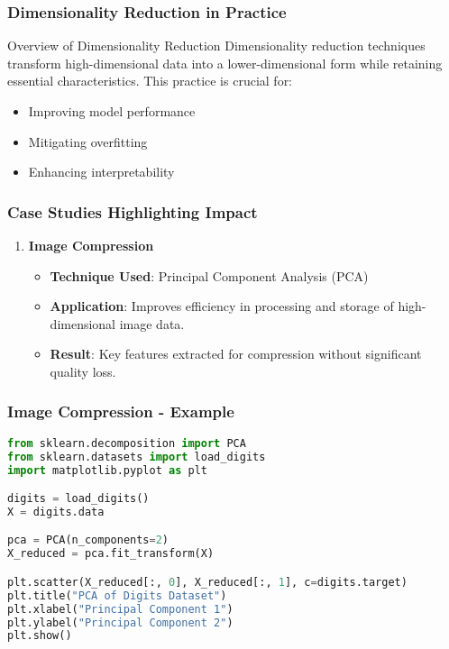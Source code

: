 \documentclass[aspectratio=169]{beamer}
\begin{document}
\begin{frame}[fragile]
    \frametitle{Dimensionality Reduction in Practice}
    \begin{block}{Overview of Dimensionality Reduction}
        Dimensionality reduction techniques transform high-dimensional data into a lower-dimensional form while retaining essential characteristics. 
        This practice is crucial for:
        \begin{itemize}
            \item Improving model performance
            \item Mitigating overfitting
            \item Enhancing interpretability
        \end{itemize}
    \end{block}
\end{frame}

\begin{frame}[fragile]
    \frametitle{Case Studies Highlighting Impact}
    \begin{enumerate}
        \item \textbf{Image Compression}
        \begin{itemize}
            \item \textbf{Technique Used}: Principal Component Analysis (PCA) 
            \item \textbf{Application}: Improves efficiency in processing and storage of high-dimensional image data.
            \item \textbf{Result}: Key features extracted for compression without significant quality loss.
        \end{itemize}
    \end{enumerate}
\end{frame}

\begin{frame}[fragile]
    \frametitle{Image Compression - Example}
    \begin{lstlisting}[language=Python]
from sklearn.decomposition import PCA
from sklearn.datasets import load_digits
import matplotlib.pyplot as plt

digits = load_digits()
X = digits.data

pca = PCA(n_components=2)
X_reduced = pca.fit_transform(X)

plt.scatter(X_reduced[:, 0], X_reduced[:, 1], c=digits.target)
plt.title("PCA of Digits Dataset")
plt.xlabel("Principal Component 1")
plt.ylabel("Principal Component 2")
plt.show()
    \end{lstlisting}
\end{frame}
\end{document}
